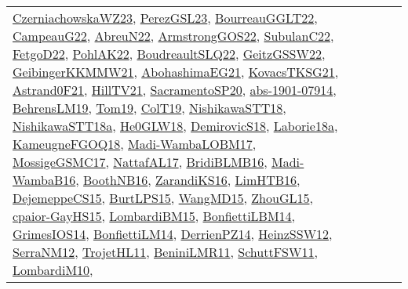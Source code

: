 {\begin{longtable}{lp{3cm}>{\raggedright}p{6cm}>{\raggedright}p{6cm}p{8cm}}
\href{articles/CzerniachowskaWZ23.pdf}{CzerniachowskaWZ23}\cite{CzerniachowskaWZ23}, \href{papers/PerezGSL23.pdf}{PerezGSL23}\cite{PerezGSL23}, \href{articles/BourreauGGLT22.pdf}{BourreauGGLT22}\cite{BourreauGGLT22}, \href{articles/CampeauG22.pdf}{CampeauG22}\cite{CampeauG22}, \href{articles/AbreuN22.pdf}{AbreuN22}\cite{AbreuN22}, \href{papers/ArmstrongGOS22.pdf}{ArmstrongGOS22}\cite{ArmstrongGOS22}, \href{articles/SubulanC22.pdf}{SubulanC22}\cite{SubulanC22}, \href{articles/FetgoD22.pdf}{FetgoD22}\cite{FetgoD22}, \href{articles/PohlAK22.pdf}{PohlAK22}\cite{PohlAK22}, \href{papers/BoudreaultSLQ22.pdf}{BoudreaultSLQ22}\cite{BoudreaultSLQ22}, \href{papers/GeitzGSSW22.pdf}{GeitzGSSW22}\cite{GeitzGSSW22}, \href{papers/GeibingerKKMMW21.pdf}{GeibingerKKMMW21}\cite{GeibingerKKMMW21}, \href{articles/AbohashimaEG21.pdf}{AbohashimaEG21}\cite{AbohashimaEG21}, \href{papers/KovacsTKSG21.pdf}{KovacsTKSG21}\cite{KovacsTKSG21}, \href{papers/Astrand0F21.pdf}{Astrand0F21}\cite{Astrand0F21}, \href{papers/HillTV21.pdf}{HillTV21}\cite{HillTV21}, \href{articles/SacramentoSP20.pdf}{SacramentoSP20}\cite{SacramentoSP20}, \href{articles/abs-1901-07914.pdf}{abs-1901-07914}\cite{abs-1901-07914}, \href{papers/BehrensLM19.pdf}{BehrensLM19}\cite{BehrensLM19}, \href{papers/Tom19.pdf}{Tom19}\cite{Tom19}, \href{papers/ColT19.pdf}{ColT19}\cite{ColT19}, \href{papers/NishikawaSTT18.pdf}{NishikawaSTT18}\cite{NishikawaSTT18}, \href{papers/NishikawaSTT18a.pdf}{NishikawaSTT18a}\cite{NishikawaSTT18a}, \href{papers/He0GLW18.pdf}{He0GLW18}\cite{He0GLW18}, \href{papers/DemirovicS18.pdf}{DemirovicS18}\cite{DemirovicS18}, \href{papers/Laborie18a.pdf}{Laborie18a}\cite{Laborie18a}, \href{papers/KameugneFGOQ18.pdf}{KameugneFGOQ18}\cite{KameugneFGOQ18}, \href{papers/Madi-WambaLOBM17.pdf}{Madi-WambaLOBM17}\cite{Madi-WambaLOBM17}, \href{papers/MossigeGSMC17.pdf}{MossigeGSMC17}\cite{MossigeGSMC17}, \href{articles/NattafAL17.pdf}{NattafAL17}\cite{NattafAL17}, \href{articles/BridiBLMB16.pdf}{BridiBLMB16}\cite{BridiBLMB16}, \href{papers/Madi-WambaB16.pdf}{Madi-WambaB16}\cite{Madi-WambaB16}, \href{papers/BoothNB16.pdf}{BoothNB16}\cite{BoothNB16}, \href{articles/ZarandiKS16.pdf}{ZarandiKS16}\cite{ZarandiKS16}, \href{papers/LimHTB16.pdf}{LimHTB16}\cite{LimHTB16}, \href{papers/DejemeppeCS15.pdf}{DejemeppeCS15}\cite{DejemeppeCS15}, \href{papers/BurtLPS15.pdf}{BurtLPS15}\cite{BurtLPS15}, \href{articles/WangMD15.pdf}{WangMD15}\cite{WangMD15}, \href{papers/ZhouGL15.pdf}{ZhouGL15}\cite{ZhouGL15}, \href{papers/cpaior-GayHS15.pdf}{cpaior-GayHS15}\cite{cpaior-GayHS15}, \href{papers/LombardiBM15.pdf}{LombardiBM15}\cite{LombardiBM15}, \href{articles/BonfiettiLBM14.pdf}{BonfiettiLBM14}\cite{BonfiettiLBM14}, \href{articles/GrimesIOS14.pdf}{GrimesIOS14}\cite{GrimesIOS14}, \href{papers/BonfiettiLM14.pdf}{BonfiettiLM14}\cite{BonfiettiLM14}, \href{papers/DerrienPZ14.pdf}{DerrienPZ14}\cite{DerrienPZ14}, \href{articles/HeinzSSW12.pdf}{HeinzSSW12}\cite{HeinzSSW12}, \href{papers/SerraNM12.pdf}{SerraNM12}\cite{SerraNM12}, \href{articles/TrojetHL11.pdf}{TrojetHL11}\cite{TrojetHL11}, \href{articles/BeniniLMR11.pdf}{BeniniLMR11}\cite{BeniniLMR11}, \href{articles/SchuttFSW11.pdf}{SchuttFSW11}\cite{SchuttFSW11}, \href{papers/LombardiM10.pdf}{LombardiM10}\cite{LombardiM10}, 
\end{longtable}}
